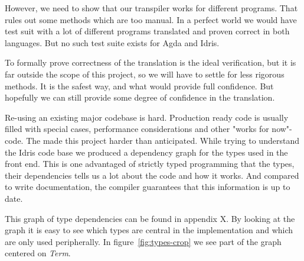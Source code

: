 \todo{ TODO Beskriv att den har listan ar lite naiv. Att det finns m[nga stege
mellan varje steg. }


However, we need to show that our transpiler works for different programs.
That rules out some methods which are too manual.  In a perfect world we would
have test suit with a lot of different programs translated and proven correct in
both languages. But no such test suite exists for Agda and Idris.


To formally prove correctness of the translation is the ideal verification, but
it is far outside the scope of this project, so we will have to settle for less
rigorous methods. It is the safest way, and what would provide full confidence.
But hopefully we can still provide some degree of confidence in the
translation.





Re-using an existing major codebase is hard. Production ready code is usually
filled with special cases, performance considerations and other "works for
now"-code. The made this project harder than anticipated. While trying to
understand the Idris code base we produced a dependency graph for the types
used in the front end. This is one advantaged of strictly typed programming
that the types, their dependencies tells us a lot about the code and how it
works. And compared to write documentation, the compiler guarantees that this
information is up to date.

\newcommand{\pterm}{\textit{PTerm}}
\newcommand{\pdecel}{\textit{PDecl}}
\newcommand{\term}{\textit{Term}}
\newcommand{\tti}{\textit{TT}}

This graph of type dependencies can be found in appendix X. By looking at the
graph it is easy to see which types are central in the implementation and which
are only used peripherally. In figure~\ref{fig:types-crop} we see part of the
graph centered on \textit{Term}.

